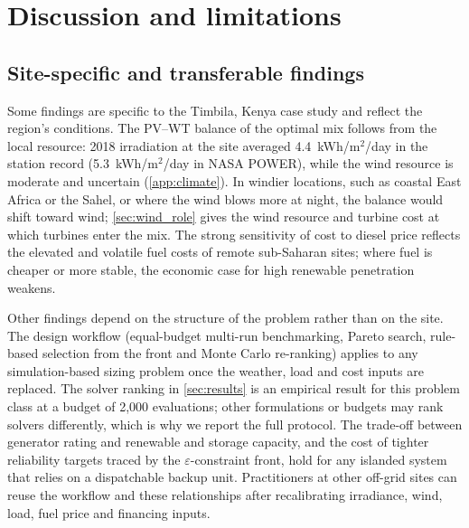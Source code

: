 \documentclass[final,3p,times]{elsarticle}
\begin{document}
\section{Discussion and limitations\label{sec:discussion}}

\subsection{Site-specific and transferable findings}
Some findings are specific to the Timbila, Kenya case study and reflect the region's conditions. The PV--WT balance of the optimal mix follows from the local resource: 2018 irradiation at the site averaged 4.4~kWh/m$^2$/day in the station record (5.3~kWh/m$^2$/day in NASA POWER), while the wind resource is moderate and uncertain (\cref{app:climate}). In windier locations, such as coastal East Africa or the Sahel, or where the wind blows more at night, the balance would shift toward wind; \cref{sec:wind_role} gives the wind resource and turbine cost at which turbines enter the mix. The strong sensitivity of cost to diesel price reflects the elevated and volatile fuel costs of remote sub-Saharan sites; where fuel is cheaper or more stable, the economic case for high renewable penetration weakens.

Other findings depend on the structure of the problem rather than on the site. The design workflow (equal-budget multi-run benchmarking, Pareto search, rule-based selection from the front and Monte Carlo re-ranking) applies to any simulation-based sizing problem once the weather, load and cost inputs are replaced. The solver ranking in \cref{sec:results} is an empirical result for this problem class at a budget of 2,000 evaluations; other formulations or budgets may rank solvers differently, which is why we report the full protocol. The trade-off between generator rating and renewable and storage capacity, and the cost of tighter reliability targets traced by the $\varepsilon$-constraint front, hold for any islanded system that relies on a dispatchable backup unit. Practitioners at other off-grid sites can reuse the workflow and these relationships after recalibrating irradiance, wind, load, fuel price and financing inputs.
\end{document}
